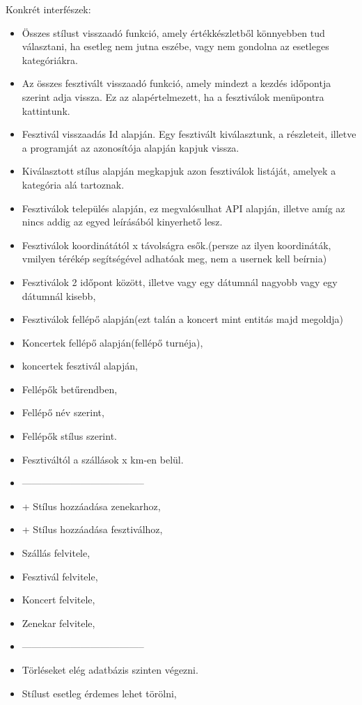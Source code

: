\documentclass[11pt]{article}
\begin{document}
Konkrét interfészek:
\begin{itemize}
\item Összes stílust visszaadó funkció, amely értékkészletből könnyebben tud választani, ha esetleg nem jutna eszébe, vagy nem gondolna az esetleges kategóriákra.
\item Az összes fesztivált visszaadó funkció, amely mindezt a kezdés időpontja szerint adja vissza. Ez az alapértelmezett, ha a fesztiválok menüpontra kattintunk.
\item Fesztivál visszaadás Id alapján. Egy fesztivált kiválasztunk, a részleteit, illetve a programját az azonosítója alapján kapjuk vissza. 
\item Kiválasztott stílus alapján megkapjuk azon fesztiválok listáját, amelyek a kategória alá tartoznak.
\item Fesztiválok település alapján, ez megvalósulhat API alapján, illetve amíg az nincs addig az egyed leírásából kinyerhető lesz. 
\item Fesztiválok koordinátától x távolságra esők.(persze az ilyen koordináták, vmilyen térékép segítségével adhatóak meg, nem a usernek kell beírnia)
\item Fesztiválok 2 időpont között, illetve vagy egy dátumnál nagyobb vagy egy dátumnál kisebb,
\item Fesztiválok fellépő alapján(ezt talán a koncert mint entitás majd megoldja)
\item Koncertek fellépő alapján(fellépő turnéja),
\item koncertek fesztivál alapján,
\item Fellépők betűrendben,
\item Fellépő név szerint,
\item Fellépők stílus szerint.
\item Fesztiváltól a szállások x km-en belül.
\item --------------------------------------
\item + Stílus hozzáadása zenekarhoz, 
\item + Stílus hozzáadása fesztiválhoz,
\item Szállás felvitele,
\item Fesztivál felvitele,
\item Koncert felvitele,
\item Zenekar felvitele,
\item --------------------------------------
\item Törléseket elég adatbázis szinten végezni.
\item Stílust esetleg érdemes lehet törölni,

\end{itemize}
\end{document}
